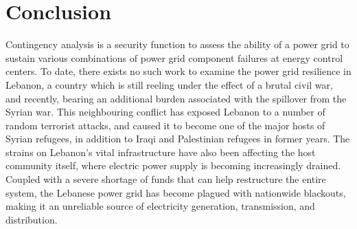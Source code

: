\section{Conclusion}
\label{conclusion}
Contingency analysis is a security function to assess the ability of a power grid to sustain various combinations of power grid component failures at energy control centers. To date, there exists no such work to examine the power grid resilience in Lebanon, a country which is still reeling under the effect of a brutal civil war, and recently, bearing an additional burden associated with the spillover from the Syrian war. This neighbouring conflict has exposed Lebanon to a number of random terrorist attacks, and caused it to become one of the major hosts of Syrian refugees, in addition to Iraqi and Palestinian refugees in former years. The strains on Lebanon's vital infrastructure have also been affecting the host community itself, where electric power supply is becoming increasingly drained. Coupled with a severe shortage of funds that can help restructure the entire system, the Lebanese power grid has become plagued with nationwide blackouts, making it an unreliable source of electricity generation, transmission, and distribution. 